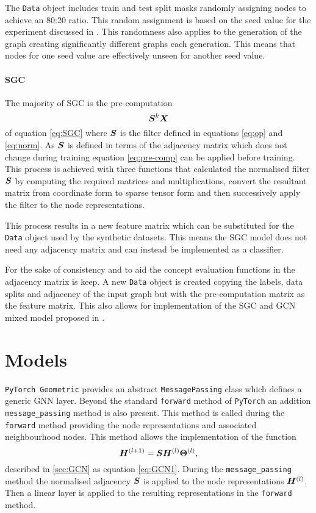 The \texttt{Data} object includes train and test split masks randomly assigning nodes to achieve an 80:20 ratio.
This random assignment is based on the seed value for the experiment discussed in .
This randomness also applies to the generation of the graph creating significantly different graphs each generation.
This means that nodes for one seed value are effectively unseen for another seed value.

\paragraph{SGC}
The majority of SGC is the pre-computation
\begin{equation}
    \label{eq:pre-comp}
    {\bm{S}}^k{\bm{X}}
\end{equation}
of equation \ref{eq:SGC} where ${\bm{S}}$ is the filter defined in equations \ref{eq:op} and \ref{eq:norm}.
As ${\bm{S}}$ is defined in terms of the adjacency matrix which does not change during training equation \ref{eq:pre-comp} can be applied before training.
This process is achieved with three functions that calculated the normalised filter ${\bm{S}}$ by computing the required matrices and multiplications, convert the resultant matrix from coordinate form to sparse tensor form and then successively apply the filter to the node representations.

This process results in a new feature matrix which can be substituted for the \texttt{Data} object used by the synthetic datasets.
This means the SGC model does not need any adjacency matrix and can instead be implemented as a classifier.

For the sake of consistency and to aid the concept evaluation functions in  the adjacency matrix is keep.
A new \texttt{Data} object is created copying the labels, data splits and adjacency of the input graph but with the pre-computation matrix as the feature matrix.
This also allows for implementation of the SGC and GCN mixed model proposed in .

\section{Models}
\label{sec:models}

\texttt{PyTorch Geometric} provides an abstract \texttt{MessagePassing} class which defines a generic GNN layer.
Beyond the standard \texttt{forward} method of \texttt{PyTorch}\cite{paszke2019pytorch} an addition \texttt{message\_passing} method is also present.
This method is called during the \texttt{forward} method providing the node representations and associated neighbourhood nodes.
This method allows the implementation of the function
\begin{equation}
    {\bm{H}}^{(l+1)} = {\bm{S}}{\bm{H}}^{(l)}\bm{\Theta}^{(l)},
\end{equation}
described in \ref{sec:GCN} as equation \ref{eq:GCN1}.
During the \texttt{message\_passing} method the normalised adjacency ${\bm{S}}$ is applied to the node representations ${\bm{H}}^{(l)}$.
Then a linear layer is applied to the resulting representations in the \texttt{forward} method.

